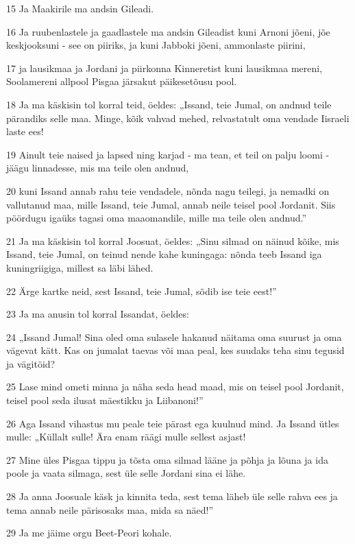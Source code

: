\par 15 Ja Maakirile ma andsin Gileadi.
\par 16 Ja ruubenlastele ja gaadlastele ma andsin Gileadist kuni Arnoni jõeni, jõe keskjooksuni - see on piiriks, ja kuni Jabboki jõeni, ammonlaste piirini,
\par 17 ja lausikmaa ja Jordani ja piirkonna Kinneretist kuni lausikmaa mereni, Soolamereni allpool Pisgaa järsakut päikesetõusu pool.
\par 18 Ja ma käskisin tol korral teid, öeldes: „Issand, teie Jumal, on andnud teile pärandiks selle maa. Minge, kõik vahvad mehed, relvastatult oma vendade Iisraeli laste ees!
\par 19 Ainult teie naised ja lapsed ning karjad - ma tean, et teil on palju loomi - jäägu linnadesse, mis ma teile olen andnud,
\par 20 kuni Issand annab rahu teie vendadele, nõnda nagu teilegi, ja nemadki on vallutanud maa, mille Issand, teie Jumal, annab neile teisel pool Jordanit. Siis pöördugu igaüks tagasi oma maaomandile, mille ma teile olen andnud.”
\par 21 Ja ma käskisin tol korral Joosuat, öeldes: „Sinu silmad on näinud kõike, mis Issand, teie Jumal, on teinud nende kahe kuningaga: nõnda teeb Issand iga kuningriigiga, millest sa läbi lähed.
\par 22 Ärge kartke neid, sest Issand, teie Jumal, sõdib ise teie eest!”
\par 23 Ja ma anusin tol korral Issandat, öeldes:
\par 24 „Issand Jumal! Sina oled oma sulasele hakanud näitama oma suurust ja oma vägevat kätt. Kas on jumalat taevas või maa peal, kes suudaks teha sinu tegusid ja vägitöid?
\par 25 Lase mind ometi minna ja näha seda head maad, mis on teisel pool Jordanit, teisel pool seda ilusat mäestikku ja Liibanoni!”
\par 26 Aga Issand vihastus mu peale teie pärast ega kuulnud mind. Ja Issand ütles mulle: „Küllalt sulle! Ära enam räägi mulle sellest asjast!
\par 27 Mine üles Pisgaa tippu ja tõsta oma silmad lääne ja põhja ja lõuna ja ida poole ja vaata silmaga, sest üle selle Jordani sina ei lähe.
\par 28 Ja anna Joosuale käsk ja kinnita teda, sest tema läheb üle selle rahva ees ja tema annab neile pärisosaks maa, mida sa näed!”
\par 29 Ja me jäime orgu Beet-Peori kohale.

